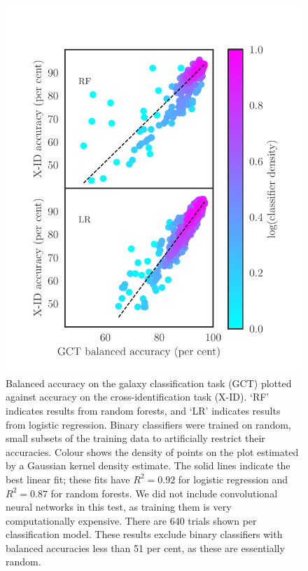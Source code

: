 \documentclass[fleqn,usenatbib,usedcolumn]{mnras}
\begin{document}
    \begin{figure}
      \centering
      \includegraphics[width=\columnwidth]{images/gct-to-xid.pdf}
      \caption{Balanced accuracy on the galaxy classification task (GCT) plotted
      against accuracy on the cross-identification task (X-ID). `RF' indicates
      results from random forests, and `LR' indicates results from logistic
      regression. Binary classifiers were trained on random, small subsets of the
      training data to artificially restrict their accuracies. Colour shows
      the density of points on the plot estimated by a Gaussian kernel density
      estimate. The solid lines indicate the best linear fit; these fits have
      $R^2 = 0.92$ for logistic regression and $R^2 = 0.87$ for random
      forests. We did not include convolutional neural networks in this test,
      as training them is very computationally expensive. There are 640 trials shown per classification model. These results
      exclude binary classifiers with balanced accuracies less than 51 per cent, as
      these are essentially random.
      \label{fig:gct-to-xid}}
    \end{figure}
\end{document}
